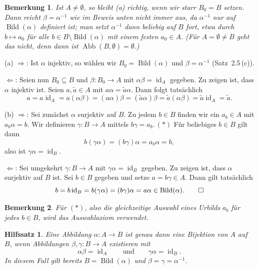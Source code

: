 \documentclass[a4paper]{article}
\makeatletter
\theoremstyle{kurzskript}
\newtheorem{hilfssatz}[satz]{Hilfssatz}
\newtheorem*{bem}{Bemerkung}
\renewenvironment{proof}[1][\proofname]{\par\pushQED{\qed}%
  \normalfont\topsep\medskipamount\relax
  \trivlist\item[\hskip\labelsep\bfseries #1\@addpunct{.}]\ignorespaces}%
  {\popQED\endtrivlist\@endpefalse}
\renewcommand{\proofname}{Beweis}
\makeatother
\begin{document}
\begin{bem}
Ist $A \neq \emptyset$, so bleibt (a) richtig, wenn wir starr $B_0 = B$ setzen. Dann reicht $\beta = \alpha^{-1}$ wie im Beweis unten nicht immer aus, da $\alpha^{-1}$ nur auf $\operatorname{Bild}(\alpha)$ definiert ist; man setzt $\alpha^{-1}$ dann beliebig auf $B$ fort, etwa durch $b \mapsto a_0$ für alle $b \in B \setminus \operatorname{Bild}(\alpha)$ mit einem festen $a_0 \in A$. (Für $A = \emptyset \neq B$ geht das nicht, denn dann ist $\operatorname{Abb}(B, \emptyset) = \emptyset$.)
\end{bem}

\begin{proof}
(a) \glqq$\Rightarrow$\grqq: Ist $\alpha$ injektiv, so wählen wir $B_0 = \operatorname{Bild}(\alpha)$ und $\beta = \alpha^{-1}$ (Satz~2.5\,(c)).

\glqq$\Leftarrow$\grqq: Seien nun $B_0 \subseteq B$ und $\beta\colon B_0 \to A$ mit $\alpha\beta = \operatorname{id}_A$ gegeben. Zu zeigen ist, dass $\alpha$ injektiv ist. Seien $a, \tilde{a} \in A$ mit $a\alpha = \tilde{a}\alpha$. Dann folgt tatsächlich
\[
  a = a\operatorname{id}_A = a(\alpha\beta) = (a\alpha)\beta = (\tilde{a}\alpha)\beta = \tilde{a}(\alpha\beta) = \tilde{a}\operatorname{id}_A = \tilde{a}.
\]

(b) \glqq$\Rightarrow$\grqq: Sei zunächst $\alpha$ surjektiv auf $B$. Zu jedem $b \in B$ finden wir ein $a_b \in A$ mit $a_b\alpha = b$. Wir definieren $\gamma\colon B \to A$ mittels $b\gamma = a_b$.\,$(*)$ Für beliebiges $b \in B$ gilt dann
\[
  b(\gamma\alpha) = (b\gamma)\alpha = a_b\alpha = b,
\]
also ist $\gamma\alpha = \operatorname{id}_B$.

\glqq$\Leftarrow$\grqq: Sei umgekehrt $\gamma\colon B \to A$ mit $\gamma\alpha = \operatorname{id}_B$ gegeben. Zu zeigen ist, dass $\alpha$ surjektiv auf $B$ ist. Sei $b \in B$ gegeben und setze $a = b\gamma \in A$. Dann gilt tatsächlich
\[
  b = b\operatorname{id}_B = b(\gamma\alpha) = (b\gamma)\alpha = a\alpha \in \operatorname{Bild}(\alpha). \qedhere
\]
\end{proof}

\begin{bem}
Für $(*)$, also die gleichzeitige Auswahl eines Urbilds $a_b$ für \emph{jedes} $b \in B$, wird das \emph{Auswahlaxiom} verwendet.
\end{bem}

\begin{hilfssatz}
Eine Abbildung $\alpha\colon A \to B$ ist genau dann eine Bijektion von $A$ auf $B$, wenn Abbildungen $\beta, \gamma\colon B \to A$ existieren mit
\[
  \alpha\beta = \operatorname{id}_A \qquad\text{und}\qquad \gamma\alpha = \operatorname{id}_B.
\]
In diesem Fall gilt bereits $B = \operatorname{Bild}(\alpha)$ und $\beta = \gamma = \alpha^{-1}$.
\end{hilfssatz}
\end{document}
